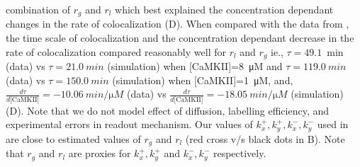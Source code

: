 \documentclass[9pt,lineno,doublespacing]{elife}
\begin{document}
combination of $r_g$ and $r_l$ which best explained the concentration dependant
changes in the rate of colocalization (D). When
compared with the data from \cite{stratton_activation-triggered_2014}, the time
scale of colocalization and the concentration dependant decrease in the rate of
colocalization compared reasonably well for $r_l$ and $r_g$ ie.,
$\tau=\SI{49.1}{\min}$ (data) vs $\tau=\SI{21.0}{min}$ (simulation) when
[CaMKII]=\SI{8}{\micro M} and $\tau=\SI{119.0}{min}$ (data) vs
$\tau=\SI{150.0}{min}$ (simulation) when [CaMKII]=\SI{1}{\micro M}, and,
$\frac{d\tau}{d\text{[CaMKII]}}=\SI{-10.06}{min\per\micro M}$ (data) vs
$\frac{d\tau}{d\text{[CaMKII]}}=\SI{-18.05}{min\per\micro M}$ (simulation)
(D). Note that we do not model effect of
diffusion, labelling efficiency, and experimental errors in readout mechanism.
Our values of $k_x^+, k_y^+, k_x^-, k_y^-$ used in  are close to
estimated values of $r_g$ and $r_l$ (red cross v/s black dots in
B). Note that $r_g$ and $r_l$ are proxies for
$k_x^+,k_y^+$ and $k_x^-, k_y^-$ respectively.
\end{document}
